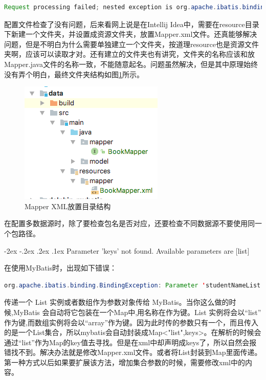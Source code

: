 \documentclass[12pt]{book}
\makeatletter
\numberwithin{dummy}{section}
\theoremstyle{ocrenumbox}
\theoremstyle{blacknumex}
\theoremstyle{blacknumbox}
\theoremstyle{ocrenum}
\renewcommand\paragraph{\@startsection{paragraph}{4}{\z@}
	{-2ex \@plus-.2ex \@minus .2ex}
	{.1ex}
	{\normalfont\small\sffamily\bfseries}}
\makeatother
\begin{document}
\begin{lstlisting}[language=Java]
Request processing failed; nested exception is org.apache.ibatis.binding.BindingException: Invalid bound statement (not found)
\end{lstlisting}

配置文件检查了没有问题，后来看网上说是在Intellij Idea中，需要在resource目录下新建一个文件夹，并设置成资源文件夹，放置Mapper.xml文件。还真能够解决问题，但是不明白为什么需要单独建立一个文件夹，按道理resource也是资源文件夹啊，应该可以读取才对。还有建立的文件夹也有讲究，文件夹的名称应该和放Mapper.java文件的名称一致，不能随意起名。问题虽然解决，但是其中原理始终没有弄个明白，最终文件夹结构如图\ref{fig:mapperreourcestructure}所示。

\begin{figure}[htbp]
	\centering
	\includegraphics[scale=0.7]{mapperreourcestructure.png}
	\caption{Mapper XML放置目录结构}
	\label{fig:mapperreourcestructure}
\end{figure}

在配置多数据源时，除了要检查包名是否对应，还要检查不同数据源不要使用同一个包路径。

\paragraph{Parameter 'keys' not found. Available parameters are [list]}

在使用MyBatis时，出现如下错误：

\begin{lstlisting}[language=Java]
org.apache.ibatis.binding.BindingException: Parameter 'studentNameList' not found. Available parameters are [list]
\end{lstlisting}

传递一个 List 实例或者数组作为参数对象传给 MyBatis。当你这么做的时 候,MyBatis 会自动将它包装在一个Map中,用名称在作为键。List 实例将会以“list” 作为键,而数组实例将会以“array”作为键。因为此时传的参数只有一个，而且传入的是一个List集合，所以mybatis会自动封装成Map<"list",keys>。在解析的时候会通过“list”作为Map的key值去寻找。但是在xml中却声明成keys了，所以自然会报错找不到。解决办法就是修改Mapper.xml文件。或者将List封装到Map里面传递。第一种方式以后如果要扩展该方法，增加集合参数的时候，需要修改xml中的内容。
\end{document}
